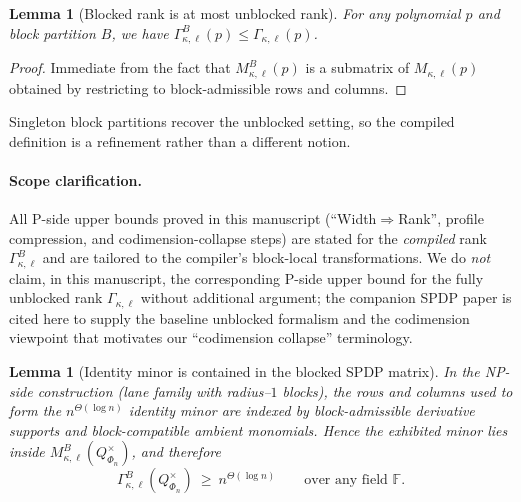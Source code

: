 \documentclass[12pt]{article}
\newtheorem{lemma}[theorem]{Lemma}
\theoremstyle{definition}
\theoremstyle{definition}
\theoremstyle{remark}
\theoremstyle{remark}
\begin{document}
\begin{lemma}[Blocked rank is at most unblocked rank]
\label{lem:blocked-vs-unblocked}
For any polynomial $p$ and block partition $B$, we have
$\Gamma^{B}_{\kappa,\ell}(p)\le\Gamma_{\kappa,\ell}(p)$.
\end{lemma}

\begin{proof}
Immediate from the fact that $M^{B}_{\kappa,\ell}(p)$ is a submatrix of $M_{\kappa,\ell}(p)$
obtained by restricting to block-admissible rows and columns.
\end{proof}

Singleton block partitions recover the unblocked setting, so the compiled
definition is a refinement rather than a different notion.

\paragraph{Scope clarification.}
All P-side upper bounds proved in this manuscript (``Width$\Rightarrow$Rank'',
profile compression, and codimension-collapse steps) are stated for the
\emph{compiled} rank $\Gamma^{B}_{\kappa,\ell}$ and are tailored to the compiler's
block-local transformations.  We do \emph{not} claim, in this manuscript, the
corresponding P-side upper bound for the fully unblocked rank $\Gamma_{\kappa,\ell}$
without additional argument; the companion SPDP paper \cite{SPDP_CODIMENSION_TOOLKIT}
is cited here to supply the baseline unblocked formalism and the codimension
viewpoint that motivates our ``codimension collapse'' terminology.

\begin{lemma}[Identity minor is contained in the blocked SPDP matrix]
\label{lem:identity-minor-blocked}\label{lem:minor-inside-blocked}
In the NP-side construction (lane family with radius--$1$ blocks), the rows and columns used
to form the $n^{\Theta(\log n)}$ identity minor are indexed by block-admissible derivative supports
and block-compatible ambient monomials. Hence the exhibited minor lies inside
$M^{B}_{\kappa,\ell}(Q^{\times}_{\Phi_n})$, and therefore
\[
\Gamma^{B}_{\kappa,\ell}(Q^{\times}_{\Phi_n})\ \ge\ n^{\Theta(\log n)}
\qquad\text{over any field } \mathbb{F}.
\]
\end{lemma}
\end{document}

